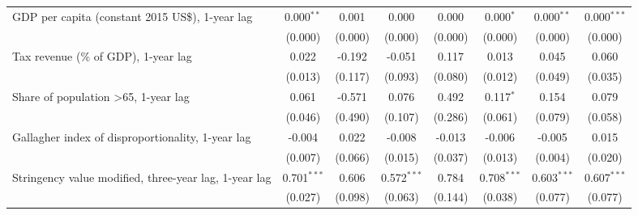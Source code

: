 \begin{table}[htbp]
\begin{tabular}{lccccccc}
      GDP per capita (constant 2015 US\$), 1-year lag                                           & 0.000$^{**}$  & 0.001                     & 0.000          & 0.000            & 0.000$^{*}$     & 0.000$^{**}$    & 0.000$^{***}$\\   
                                                                                                & (0.000)       & (0.000)                   & (0.000)        & (0.000)          & (0.000)         & (0.000)         & (0.000)\\   
      Tax revenue (\% of GDP), 1-year lag                                                       & 0.022         & -0.192                    & -0.051         & 0.117            & 0.013           & 0.045           & 0.060\\   
                                                                                                & (0.013)       & (0.117)                   & (0.093)        & (0.080)          & (0.012)         & (0.049)         & (0.035)\\   
      Share of population >65, 1-year lag                                                       & 0.061         & -0.571                    & 0.076          & 0.492            & 0.117$^{*}$     & 0.154           & 0.079\\   
                                                                                                & (0.046)       & (0.490)                   & (0.107)        & (0.286)          & (0.061)         & (0.079)         & (0.058)\\   
      Gallagher index of disproportionality, 1-year lag                                         & -0.004        & 0.022                     & -0.008         & -0.013           & -0.006          & -0.005          & 0.015\\   
                                                                                                & (0.007)       & (0.066)                   & (0.015)        & (0.037)          & (0.013)         & (0.004)         & (0.020)\\   
      Stringency value modified, three-year lag, 1-year lag                                     & 0.701$^{***}$ & 0.606                     & 0.572$^{***}$  & 0.784            & 0.708$^{***}$   & 0.603$^{***}$   & 0.607$^{***}$\\   
                                                                                                & (0.027)       & (0.098)                   & (0.063)        & (0.144)          & (0.038)         & (0.077)         & (0.077)\\   

\end{tabular}
\end{table}
